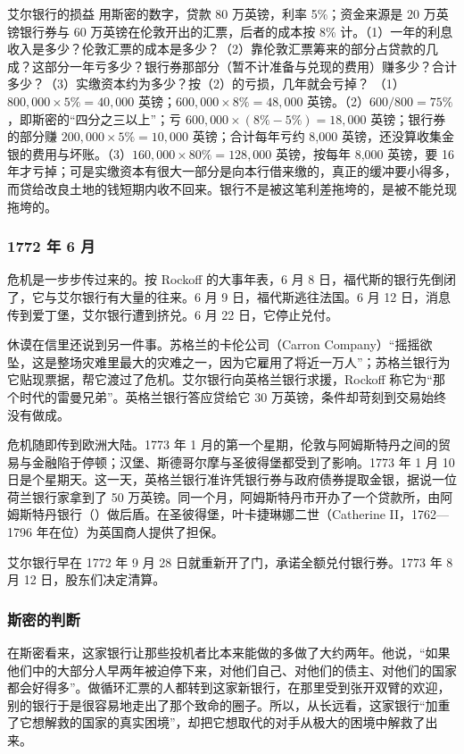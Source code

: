 \begin{example}{艾尔银行的损益}\label{ex:smith-ayr}
用斯密的数字，贷款 80 万英镑，利率 5\%；资金来源是 20 万英镑银行券与 60 万英镑在伦敦开出的汇票，后者的成本按 8\% 计。（1）一年的利息收入是多少？伦敦汇票的成本是多少？（2）靠伦敦汇票筹来的部分占贷款的几成？这部分一年亏多少？银行券那部分（暂不计准备与兑现的费用）赚多少？合计多少？（3）实缴资本约为多少？按（2）的亏损，几年就会亏掉？
\solution （1）$800{,}000\times5\%=40{,}000$ 英镑；$600{,}000\times8\%=48{,}000$ 英镑。（2）$600/800=75\%$，即斯密的“四分之三以上”；亏 $600{,}000\times(8\%-5\%)=18{,}000$ 英镑；银行券的部分赚 $200{,}000\times5\%=10{,}000$ 英镑；合计每年亏约 8,000 英镑，还没算收集金银的费用与坏账。（3）$160{,}000\times80\%=128{,}000$ 英镑，按每年 8,000 英镑，要 16 年才亏掉；可是实缴资本有很大一部分是向本行借来缴的，真正的缓冲要小得多，而贷给改良土地的钱短期内收不回来。银行不是被这笔利差拖垮的，是被不能兑现拖垮的。
\end{example}

\subsubsection{1772 年 6 月}
危机是一步步传过来的。按 Rockoff 的大事年表，6 月 8 日，福代斯的银行先倒闭了，它与艾尔银行有大量的往来。6 月 9 日，福代斯逃往法国。6 月 12 日，消息传到爱丁堡，艾尔银行遭到挤兑。6 月 22 日，它停止兑付\cite{rockoff2009}。

休谟在信里还说到另一件事。苏格兰的卡伦公司（Carron Company）“摇摇欲坠，这是整场灾难里最大的灾难之一，因为它雇用了将近一万人”；苏格兰银行为它贴现票据，帮它渡过了危机\cite{rockoff2009}。艾尔银行向英格兰银行求援，Rockoff 称它为“那个时代的雷曼兄弟”。英格兰银行答应贷给它 30 万英镑，条件却苛刻到交易始终没有做成\cite{rockoff2009}。

危机随即传到欧洲大陆。1773 年 1 月的第一个星期，伦敦与阿姆斯特丹之间的贸易与金融陷于停顿；汉堡、斯德哥尔摩与圣彼得堡都受到了影响\cite{rockoff2009}。1773 年 1 月 10 日是个星期天。这一天，英格兰银行准许凭银行券与政府债券提取金银，据说一位荷兰银行家拿到了 50 万英镑\cite{rockoff2009}。同一个月，阿姆斯特丹市开办了一个贷款所，由阿姆斯特丹银行（）做后盾。在圣彼得堡，叶卡捷琳娜二世（Catherine II，1762—1796 年在位）为英国商人提供了担保\cite{rockoff2009}。

艾尔银行早在 1772 年 9 月 28 日就重新开了门，承诺全额兑付银行券。1773 年 8 月 12 日，股东们决定清算\cite{rockoff2009}。

\subsubsection{斯密的判断}
在斯密看来，这家银行让那些投机者比本来能做的多做了大约两年。他说，“如果他们中的大部分人早两年被迫停下来，对他们自己、对他们的债主、对他们的国家都会好得多”\cite{smith1776}。做循环汇票的人都转到这家新银行，在那里受到张开双臂的欢迎，别的银行于是很容易地走出了那个致命的圈子。所以，从长远看，这家银行“加重了它想解救的国家的真实困境”，却把它想取代的对手从极大的困境中解救了出来\cite{smith1776}。

